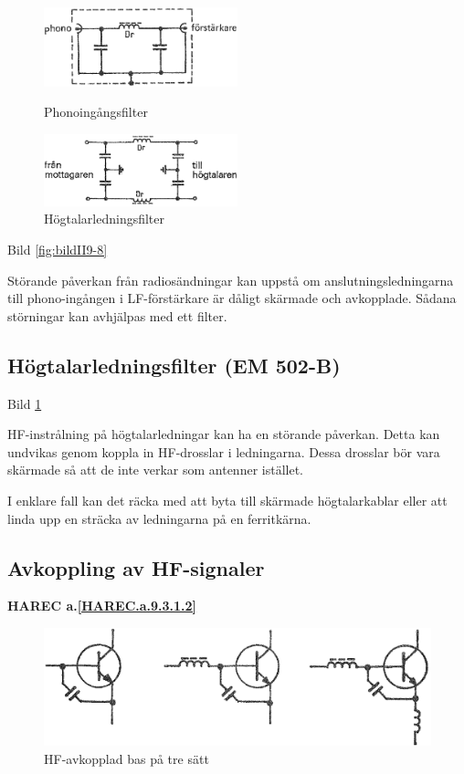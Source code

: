 \begin{figure}
  \includegraphics[width=0.5\textwidth]{images/cropped_pdfs/bild_2_9-08.pdf}
  \caption{Phonoingångsfilter}
  \label{fig:bildII9-8}
  \includegraphics[width=0.5\textwidth]{images/cropped_pdfs/bild_2_9-09.pdf}
  \caption{Högtalarledningsfilter}
  \label{fig:bildII9-9}
\end{figure}

Bild \ref{fig:bildII9-8}

Störande påverkan från radiosändningar kan uppstå om
anslutningsledningarna till phono-ingången i LF-förstärkare är dåligt
skärmade och avkopplade. Sådana störningar kan avhjälpas med ett
filter.

\subsection{Högtalarledningsfilter (EM 502-B)}

Bild \ref{fig:bildII9-9}

HF-instrålning på högtalarledningar kan ha en störande påverkan. Detta
kan undvikas genom koppla in HF-drosslar i ledningarna.  Dessa
drosslar bör vara skärmade så att de inte verkar som antenner
istället.

I enklare fall kan det räcka med att byta till skärmade högtalarkablar
eller att linda upp en sträcka av ledningarna på en ferritkärna.

\subsection{Avkoppling av HF-signaler}
\textbf{
HAREC a.\ref{HAREC.a.9.3.1.2}\label{myHAREC.a.9.3.1.2}
}

\begin{figure}
  \includegraphics[width=\textwidth]{images/cropped_pdfs/bild_2_9-10b.pdf}
  \caption{HF-avkopplad bas på tre sätt}
  \label{fig:bildII9-10b}
\end{figure}

